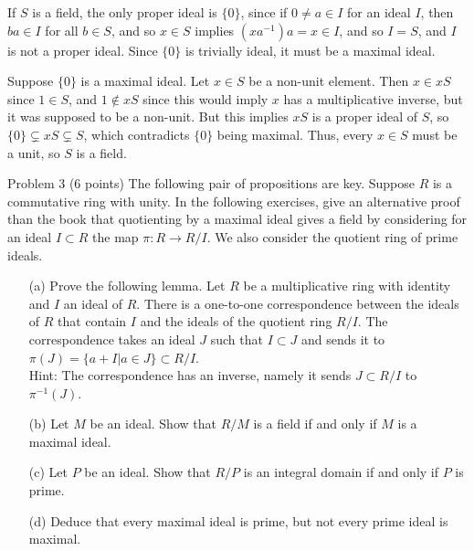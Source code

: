 \documentclass{hmwk}
\begin{document}
\begin{solution}

\pre If $S$ is a field, the only proper ideal is $\{0\}$, since if $0 \neq a \in I$ for an ideal $I$, then $ba \in I$ for all $b \in S$, and so $x \in S$ implies $(xa^{-1})a = x \in I$, and so $I = S$, and $I$ is not a proper ideal. Since $\{0\}$ is trivially ideal, it must be a maximal ideal.

\pre Suppose $\{0\}$ is a maximal ideal. Let $x \in S$ be a non-unit element. Then $x \in xS$ since $1 \in S$, and $1 \notin xS$ since this would imply $x$ has a multiplicative inverse, but it was supposed to be a non-unit. But this implies $xS$ is a proper ideal of $S$, so $\{0\} \subsetneq xS \subsetneq S$, which contradicts $\{0\}$ being maximal. Thus, every $x \in S$ must be a unit, so $S$ is a field. 
\end{solution}

\begin{problem}{Problem 3}
(6 points) The following pair of propositions are key. Suppose $R$ is a commutative ring with unity. In the following exercises, give an alternative proof than the book that quotienting by a maximal ideal gives a field by considering for an ideal $I \subset R$ the map $\pi: R \to R/I$. We also consider the quotient ring of prime ideals.
\begin{itemize}
    \item[(a)] Prove the following lemma. Let $R$ be a multiplicative ring with identity and $I$ an ideal of $R$. There is a one-to-one correspondence between the ideals of $R$ that contain $I$ and the ideals of the quotient ring $R/I$. The correspondence takes an ideal $J$ such that $I\subset J$ and sends it to $\pi(J) =  \{a + I | a \in J\} \subset R/I$. \\
    Hint: The correspondence has an inverse, namely it sends $J \subset R/I$ to $\pi^{-1}(J)$.  
    \item[(b)]  Let $M$ be an ideal. Show that $R/M$ is a field if and only if $M$ is a maximal ideal. 
    \item[(c)]  Let $P$ be an ideal. Show that $R/P$ is an integral domain if and only if $P$ is prime.
    \item[(d)] Deduce that every maximal ideal is prime, but not every prime ideal is maximal.
\end{itemize}
\end{problem}
\end{document}
